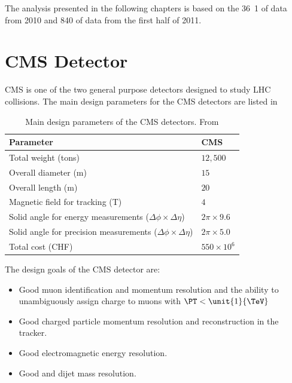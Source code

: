 The analysis presented in the following chapters is based on the \unit{36.1} of
data from  2010 and \unit{840}{\invpb} of data from the first half of 2011.

\section{CMS Detector}
\ac{CMS} is one of the two general purpose
detectors designed to study LHC collisions. The main design parameters for the
\ac{CMS} detectors  are listed in 

\begin{table}[htbp]
\begin{center}
\begin{tabular}{ l l }
\toprule
Parameter & CMS \\
\midrule
Total weight (tons)                 & $12,500$  \\
Overall diameter (m)                & $15$  \\
Overall length (m)                  & $20$  \\
Magnetic field for tracking (T)     & $4$  \\
Solid angle for energy measurements ($\Delta\phi \times \Delta\eta$)   
                                    & $2\pi \times 9.6$  \\
Solid angle for precision measurements ($\Delta\phi \times \Delta\eta$)   
                                    & $2\pi \times 5.0$  \\
Total cost (CHF)                    & $550\times 10 ^{6}$  \\
\bottomrule
\end{tabular}
\caption{Main design parameters of the CMS detectors. From \cite{parris}}
\end{center}
\label{tab:cmsparam}
\end{table}

The design goals of the CMS detector are:\cite{tdr}
\begin{itemize}
  \item Good muon identification and momentum resolution and the ability to
unambiguously assign charge to muons with $\PT < \unit{1}{\TeV}$
  \item Good charged particle momentum resolution and reconstruction in the
tracker.
  \item Good electromagnetic energy resolution. 
  \item Good \ETmiss and dijet mass resolution.
\end{itemize}

